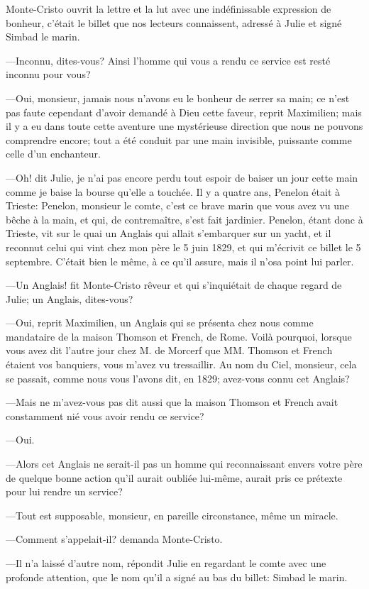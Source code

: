 Monte-Cristo ouvrit la lettre et la lut avec une indéfinissable expression de bonheur, c'était le billet que nos lecteurs connaissent, adressé à Julie et signé Simbad le marin. 

—Inconnu, dites-vous? Ainsi l'homme qui vous a rendu ce service est resté inconnu pour vous? 

—Oui, monsieur, jamais nous n'avons eu le bonheur de serrer sa main; ce n'est pas faute cependant d'avoir demandé à Dieu cette faveur, reprit Maximilien; mais il y a eu dans toute cette aventure une mystérieuse direction que nous ne pouvons comprendre encore; tout a été conduit par une main invisible, puissante comme celle d'un enchanteur. 

—Oh! dit Julie, je n'ai pas encore perdu tout espoir de baiser un jour cette main comme je baise la bourse qu'elle a touchée. Il y a quatre ans, Penelon était à Trieste: Penelon, monsieur le comte, c'est ce brave marin que vous avez vu une bêche à la main, et qui, de contremaître, s'est fait jardinier. Penelon, étant donc à Trieste, vit sur le quai un Anglais qui allait s'embarquer sur un yacht, et il reconnut celui qui vint chez mon père le 5 juin 1829, et qui m'écrivit ce billet le 5 septembre. C'était bien le même, à ce qu'il assure, mais il n'osa point lui parler. 

—Un Anglais! fit Monte-Cristo rêveur et qui s'inquiétait de chaque regard de Julie; un Anglais, dites-vous?  

—Oui, reprit Maximilien, un Anglais qui se présenta chez nous comme mandataire de la maison Thomson et French, de Rome. Voilà pourquoi, lorsque vous avez dit l'autre jour chez M. de Morcerf que MM. Thomson et French étaient vos banquiers, vous m'avez vu tressaillir. Au nom du Ciel, monsieur, cela se passait, comme nous vous l'avons dit, en 1829; avez-vous connu cet Anglais? 

—Mais ne m'avez-vous pas dit aussi que la maison Thomson et French avait constamment nié vous avoir rendu ce service? 

—Oui. 

—Alors cet Anglais ne serait-il pas un homme qui reconnaissant envers votre père de quelque bonne action qu'il aurait oubliée lui-même, aurait pris ce prétexte pour lui rendre un service? 

—Tout est supposable, monsieur, en pareille circonstance, même un miracle. 

—Comment s'appelait-il? demanda Monte-Cristo. 

—Il n'a laissé d'autre nom, répondit Julie en regardant le comte avec une profonde attention, que le nom qu'il a signé au bas du billet: Simbad le marin. 

